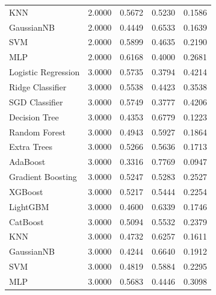 \begin{tabular}{lrrrr}
KNN & 2.0000 & 0.5672 & 0.5230 & 0.1586 \\
GaussianNB & 2.0000 & 0.4449 & 0.6533 & 0.1639 \\
SVM & 2.0000 & 0.5899 & 0.4635 & 0.2190 \\
MLP & 2.0000 & 0.6168 & 0.4000 & 0.2681 \\
Logistic Regression & 3.0000 & 0.5735 & 0.3794 & 0.4214 \\
Ridge Classifier & 3.0000 & 0.5538 & 0.4423 & 0.3538 \\
SGD Classifier & 3.0000 & 0.5749 & 0.3777 & 0.4206 \\
Decision Tree & 3.0000 & 0.4353 & 0.6779 & 0.1223 \\
Random Forest & 3.0000 & 0.4943 & 0.5927 & 0.1864 \\
Extra Trees & 3.0000 & 0.5266 & 0.5636 & 0.1713 \\
AdaBoost & 3.0000 & 0.3316 & 0.7769 & 0.0947 \\
Gradient Boosting & 3.0000 & 0.5247 & 0.5283 & 0.2527 \\
XGBoost & 3.0000 & 0.5217 & 0.5444 & 0.2254 \\
LightGBM & 3.0000 & 0.4600 & 0.6339 & 0.1746 \\
CatBoost & 3.0000 & 0.5094 & 0.5532 & 0.2379 \\
KNN & 3.0000 & 0.4732 & 0.6257 & 0.1611 \\
GaussianNB & 3.0000 & 0.4244 & 0.6640 & 0.1912 \\
SVM & 3.0000 & 0.4819 & 0.5884 & 0.2295 \\
MLP & 3.0000 & 0.5683 & 0.4446 & 0.3098 \\
\bottomrule
\end{tabular}
